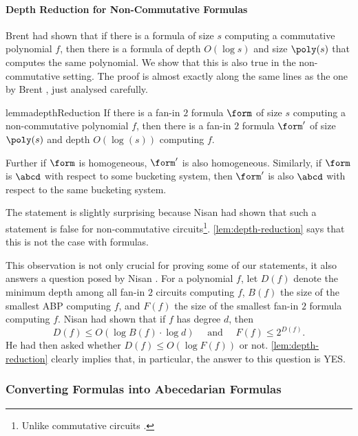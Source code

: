 \paragraph*{Depth Reduction for Non-Commutative Formulas}

Brent \cite{B74} had shown that if there is a formula of size $s$ computing a commutative polynomial $f$, then there is a formula of depth $O(\log s)$ and size $\poly(s)$ that computes the same polynomial. 
We show that this is also true in the non-commutative setting.
The proof is almost exactly along the same lines as the one by Brent \cite{B74}, just analysed carefully.

\begin{restatable}{lemma}{depthReduction}\label{lem:depth-reduction}
	If there is a fan-in $2$ formula $\form$ of size $s$ computing a non-commutative polynomial $f$, then there is a fan-in $2$ formula $\form'$ of size $\poly(s)$ and depth $O(\log(s))$ computing $f$.

	Further if $\form$ is homogeneous, $\form'$ is also homogeneous. Similarly, if $\form$ is $\abcd$ with respect to some bucketing system, then $\form'$ is also $\abcd$ with respect to the same bucketing system.
\end{restatable}

The statement is slightly surprising because Nisan \cite{N91} had shown that such a statement is false for non-commutative circuits\footnote{Unlike commutative circuits \cite{VSBR83}.}.
%
%
\autoref{lem:depth-reduction} says that this is not the case with formulas.

This observation is not only crucial for proving some of our statements, it also answers a question posed by Nisan \cite{N91}.
For a polynomial $f$, let $D(f)$ denote the minimum depth among all fan-in $2$ circuits computing $f$, $B(f)$ the size of the smallest ABP computing $f$, and $F(f)$ the size of the smallest fan-in $2$ formula computing $f$. 
Nisan \cite{N91} had shown that if $f$ has degree $d$, then
\[
	D(f) \leq O(\log B(f) \cdot \log d) \quad \text{ and } \quad F(f) \leq 2^{D(f)}.
\]
He had then asked whether $D(f) \leq O(\log F(f))$ or not. 
\autoref{lem:depth-reduction} clearly implies that, in particular, the answer to this question is YES.

\subsubsection*{Converting Formulas into Abecedarian Formulas}

